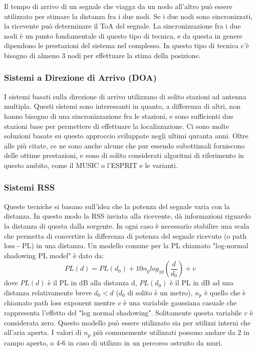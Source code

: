Il tempo di arrivo di un segnale che viagga da un nodo all'altro può essere utilizzato per stimare la distanza fra i due nodi. Se i due nodi sono sincronizzati, la ricevente può determinare il ToA del segnale. La sincronizzazione fra i due nodi è un punto fondamentale di questo tipo di tecnica, e da questa in genere dipendono le prestazioni del sistema nel complesso. In questo tipo di tecnica c'è bisogno di almeno 3 nodi per effettuare la stima della posizione.

\subsubsection{Sistemi a Direzione di Arrivo (DOA)}

I sistemi basati sulla direzione di arrivo utilizzano di solito stazioni ad antenna multipla. Questi sistemi sono interessanti in quanto, a differenza di altri, non hanno bisogno di una sincronizzazione fra le stazioni, e sono sufficienti due stazioni base per permettere	di effettuare la localizzazione. Ci sono molte soluzioni basate su questo approccio sviluppate negli ultimi quranta anni. Oltre alle più citate, ce ne sono anche alcune che pur essendo subottimali forniscono delle ottime prestazioni, e sono di solito considerati algoritmi di riferimento in questo ambito, come il MUSIC o l'ESPRIT e le varianti.

\subsubsection{Sistemi RSS}
Queste tecniche si basano sull'idea che la potenza del segnale varia con la distanza. In questo modo la RSS inviata alla ricevente, dà informazioni riguardo la distanza di questa dalla sorgente. In ogni caso è necessario stabilire una scala che permetta di convertire la differenza di potenza del segnale ricevuto (o path loss - PL) in una distanza. Un modello comune per la PL chiamato "log-normal shadowing PL model" è dato da:
 $$ PL\left(d\right) = PL\left(d_0\right) + 10n_plog_{10} \left( \frac{d}{d_0} \right) + v $$
dove $ PL(d) $ è il PL in dB alla distanza d, $ PL(d_0) $ è il PL in dB ad una distanza relativamente breve $ d_0 < d $ ($ d_{0} $ di solito è un metro), $n_p$ è quello che è chiamato path loss exponent mentre $v$ è una variabile gaussiana casuale che rappresenta l'effetto del "log normal shadowing". Solitamente questa variabile $v$ è considerata zero. Questo modello può essere utilizzato sia per utilizzi interni che all'aria aperta. I valori di $n_p$ più comunemente utilizzati possono andare da 2 in campo aperto, o 4-6 in caso di utilizzo in un percorso ostruito da muri.
